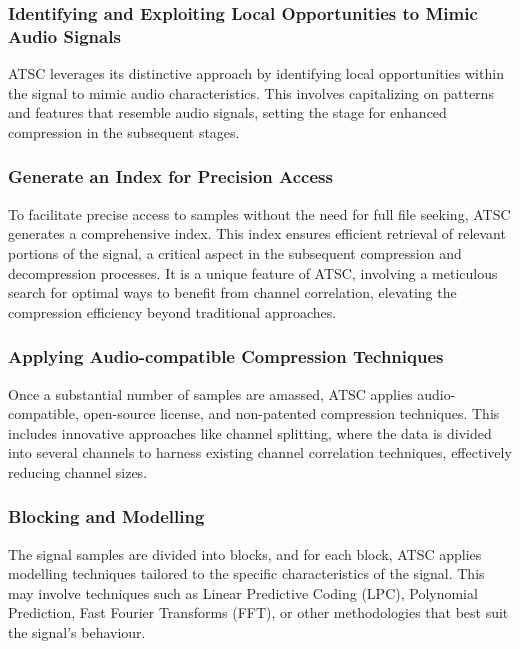 \documentclass[conference]{IEEEtran}
\begin{document}
\vspace{10pt}
\subsubsection{Identifying and Exploiting Local Opportunities to Mimic Audio Signals}
ATSC leverages its distinctive approach by identifying local opportunities within the signal to mimic audio characteristics. This involves capitalizing on patterns and features that resemble audio signals, setting the stage for enhanced compression in the subsequent stages.

\vspace{10pt}
\subsubsection{Generate an Index for Precision Access}
To facilitate precise access to samples without the need for full file seeking, ATSC generates a comprehensive index. This index ensures efficient retrieval of relevant portions of the signal, a critical aspect in the subsequent compression and decompression processes. It is a unique feature of ATSC, involving a meticulous search for optimal ways to benefit from channel correlation, elevating the compression efficiency beyond traditional approaches.

\vspace{10pt}
\subsubsection{Applying Audio-compatible Compression Techniques}
Once a substantial number of samples are amassed, ATSC applies audio-compatible, open-source license, and non-patented compression techniques. This includes innovative approaches like channel splitting, where the data is divided into several channels to harness existing channel correlation techniques, effectively reducing channel sizes.

\vspace{10pt}
\subsubsection{Blocking and Modelling}
The signal samples are divided into blocks, and for each block, ATSC applies modelling techniques tailored to the specific characteristics of the signal. This may involve techniques such as Linear Predictive Coding (LPC), Polynomial Prediction, Fast Fourier Transforms (FFT), or other methodologies that best suit the signal's behaviour.
\end{document}
